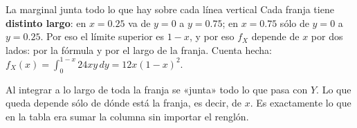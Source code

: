 \begin{afondo}{La marginal junta todo lo que hay sobre cada línea vertical}
Cada franja tiene \textbf{distinto largo}: en $x=0.25$ va de $y=0$ a $y=0.75$; en $x=0.75$ sólo de $y=0$ a $y=0.25$. Por eso el
límite superior es $1-x$, y por eso $f_X$ depende de $x$ por dos lados: por la fórmula y por el largo de la franja.
Cuenta hecha: $f_X(x)=\int_0^{1-x}24xy\,dy=12x(1-x)^2$.

Al integrar a lo largo de toda la franja se «junta» todo lo que pasa con $Y$. Lo que queda depende sólo de dónde está la
franja, es decir, de $x$. Es exactamente lo que en la tabla era sumar la columna sin importar el renglón.
\end{afondo}
